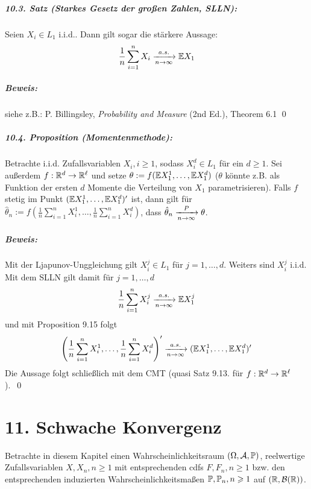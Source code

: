 \documentclass[11pt]{report}
\begin{document}
\paragraph{10.3. Satz (Starkes Gesetz der gro\ss{}en Zahlen, SLLN):} Seien
$X_i\in L_1$ i.i.d.. Dann gilt sogar die st\"arkere Aussage: 
$$\dfrac{1}{n}\sum_{i=1}^nX_i\nto{a.s.}{n\to\infty}\E X_1$$ 

\paragraph{Beweis:} siehe z.B.: P. Billingsley, \textit{Probability and Measure} (2nd Ed.), Theorem 6.1 \qed

\paragraph{10.4. Proposition (Momentenmethode):} Betrachte i.i.d. Zufallsvariablen $X_i,i\geq1$, sodass $X_i^d\in L_1$ für ein $d\geq1$. Sei außerdem $f:\mathbb{R}^d\to\mathbb{R}^\ell$ und setze $\theta:=f(\mathbb{E} X_1^1,\hdots,\mathbb{E} X_1^d)$ ($\theta$ könnte z.B. als Funktion der ersten $d$ Momente die Verteilung von $X_1$ parametrisieren). Falls $f$ stetig im Punkt $(\mathbb{E} X_1^1,\hdots,\mathbb{E} X_1^d)'$ ist, dann gilt für $\hat\theta_n:=f\left(\frac{1}{n}\sum_{i=1}^nX_i^1,\hdots,\frac{1}{n}\sum_{i=1}^nX_i^d\right)$, dass $\hat\theta_n\nto{P}{n\to\infty}\theta$.

\paragraph{Beweis:}Mit der Ljapunov-Unggleichung gilt $X_i^j\in L_1$ für $j=1,\hdots,d$. Weiters sind $X_i^j$ i.i.d. Mit dem SLLN gilt damit für $j=1,\hdots,d$
$$\dfrac{1}{n}\sum_{i=1}^nX_i^j\nto{a.s.}{n\to\infty}\E X_1^j$$
und mit Proposition 9.15 folgt 
$$\left(\frac{1}{n}\sum_{i=1}^nX_i^1,\hdots,\frac{1}{n}\sum_{i=1}^nX_i^d\right)'\nto{a.s.}{n\to\infty}(\E X_1^1,\hdots,\E X_1^d)'$$
Die Aussage folgt schließlich mit dem CMT (quasi Satz 9.13. für $f:\mathbb{R}^d\to\mathbb{R}^\ell$). \qed 


\chapter*{11. Schwache Konvergenz}
 Betrachte in diesem Kapitel einen Wahrscheinlichkeitsraum $(\Omega, \mathcal{A}, \mathbb{P})$, reelwertige Zufallsvariablen $X, X_n, n\geq1$ mit entsprechenden cdfs $F,F_n,n\geq1$ bzw. den entsprechenden induzierten Wahrscheinlichkeitsma\ss{}en $\mathbb{P}, \mathbb{P}_n,n\geqslant 1$ auf $(\mathbb{R}, \mathcal{B}(\mathbb{R}))$.
	
\end{document}
